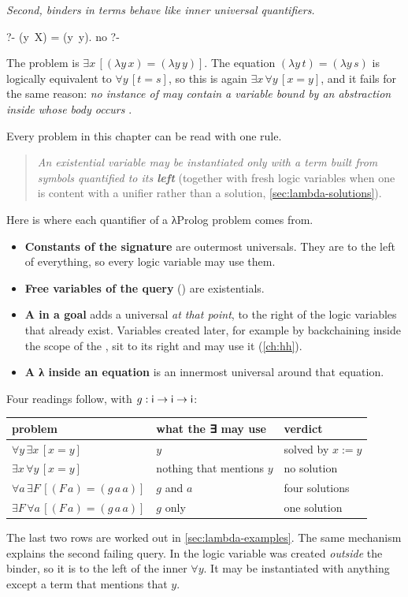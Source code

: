 {\emph{Second, binders in terms behave like inner universal quantifiers.}
\begin{lprolog}
?- (y\ X) = (y\ y).
no
?-
\end{lprolog}
The problem is $\exists x\,[(\lambda y\,x)=(\lambda y\,y)]$. The equation $(\lambda y\,t)=(\lambda y\,s)$
is logically equivalent to $\forall y\,[t=s]$, so this is again $\exists x\,\forall y\,[x=y]$, and it
fails for the same reason: \emph{no instance of  may contain a variable bound by an abstraction
inside whose body  occurs} .

\begin{tutorial}
Every problem in this chapter can be read with one rule.
\begin{quote}
\emph{An existential variable may be instantiated only with a term built from symbols quantified to its
\textbf{left}} (together with fresh logic variables when one is content with a unifier rather than a
solution, \cref{sec:lambda-solutions}).
\end{quote}
Here is where each quantifier of a λProlog problem comes from.
\begin{itemize}[nosep]
\item \textbf{Constants of the signature} are outermost universals. They are to the left of everything,
      so every logic variable may use them.
\item \textbf{Free variables of the query} () are existentials.
\item \textbf{A  in a goal} adds a universal \emph{at that point}, to the right of the logic
      variables that already exist. Variables created later, for example by backchaining inside the
      scope of the , sit to its right and may use it (\cref{ch:hh}).
\item \textbf{A λ inside an equation} is an innermost universal around that equation.
\end{itemize}
Four readings follow, with $g:\mathsf{i}\to\mathsf{i}\to\mathsf{i}$:
\begin{center}
\begin{tabular}{@{}lll@{}}
\toprule
problem & what the ∃ may use & verdict\\
\midrule
$\forall y\,\exists x\,[x=y]$ & $y$ & solved by $x:=y$\\
$\exists x\,\forall y\,[x=y]$ & nothing that mentions $y$ & no solution\\
$\forall a\,\exists F\,[(F\,a)=(g\,a\,a)]$ & $g$ and $a$ & four solutions\\
$\exists F\,\forall a\,[(F\,a)=(g\,a\,a)]$ & $g$ only & one solution\\
\bottomrule
\end{tabular}
\end{center}
The last two rows are worked out in \cref{sec:lambda-examples}. The same mechanism explains the
second failing query. In  the logic variable  was created
\emph{outside} the binder, so it is to the left of the inner $\forall y$. It may be instantiated with
anything except a term that mentions that $y$.
\end{tutorial}

}
